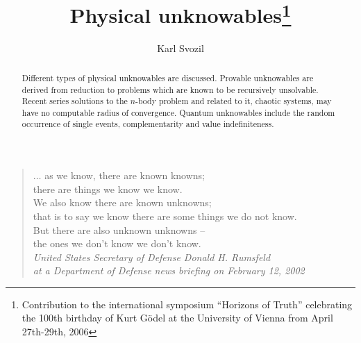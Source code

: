 \documentclass[rmp,amsfonts,showpacs,showkeys]{revtex4}
\begin{document}

\title{Physical unknowables\footnote{Contribution to
the international symposium ``Horizons of Truth''
celebrating the 100th birthday of Kurt G\"odel
at  the University of Vienna from April 27th-29th, 2006}}

\author{Karl Svozil}


\begin{abstract}
Different types of physical unknowables are discussed.
Provable unknowables are derived from reduction to problems which are known to be recursively unsolvable.
Recent series solutions to the $n$-body problem and related to it, chaotic systems, may have no computable radius of convergence.
Quantum unknowables include the random occurrence of single events, complementarity and value indefiniteness.
\end{abstract}



\maketitle

\tableofcontents

\begin{quote}
\begin{flushright}
{\footnotesize
$\ldots$ as we know, there are known knowns; \\
there are things we know we know. \\
We also know there are known unknowns; \\
that is to say we know there are some things we do not know. \\
But there are also unknown unknowns --\\
the ones we don't know we don't know.  \\
{\em United States Secretary of Defense Donald H. Rumsfeld \\
at a Department of Defense news briefing on February 12, 2002}
 }
\end{flushright}
\end{quote}
\end{document}
